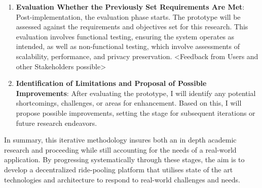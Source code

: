 \begin{enumerate}
    \item \textbf{Evaluation Whether the Previously Set Requirements Are Met}: 
    Post-implementation, the evaluation phase starts. The prototype will be assessed against the requirements and objectives set for this research. This evaluation involves functional testing, ensuring the system operates as intended, as well as non-functional testing, which involve assessments of scalability, performance, and privacy preservation. <Feedback from Users and other Stakeholders possible>

    \item \textbf{Identification of Limitations and Proposal of Possible Improvements}:
After evaluating the prototype, I will identify any potential shortcomings, challenges, or areas for enhancement. Based on this, I will propose possible improvements, setting the stage for subsequent iterations or future research endeavors.
\end{enumerate}

In summary, this iterative methodology insures both an in depth academic research and proceeding while still accounting for the needs of a real-world application. By progressing systematically through these stages, the aim is to develop a decentralized ride-pooling platform that utilises state of the art technologies and architecture to respond to real-world challenges and needs.
